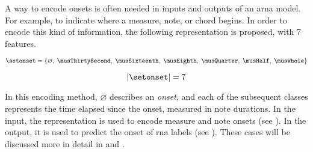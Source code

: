 
A way to encode onsets is often needed in inputs and outputs
of an \gls{arna} model. For example, to indicate where a
measure, note, or chord begins. 
In order to encode this kind of information, the following
representation is proposed, with 7 features.

\begin{equation}
    \label{eq:onset_7}
    \setonset = \{\varnothing,\; \musThirtySecond,\; \musSixteenth,\; 
    \musEighth,\; \musQuarter,\; \musHalf,\; \musWhole \}
\end{equation}

\begin{equation}
    \label{eq:onset_7_magnitude}
    | \setonset | = 7
\end{equation}

In this encoding method, $\varnothing$ describes an
\emph{onset}, and each of the subsequent classes represents
the time elapsed since the onset, measured in note
durations. In the input, the representation is used to
encode measure and note onsets (see
). In the output, it is
used to predict the onset of \gls{rna} labels (see
). These cases will be discussed
more in detail in  and
.
